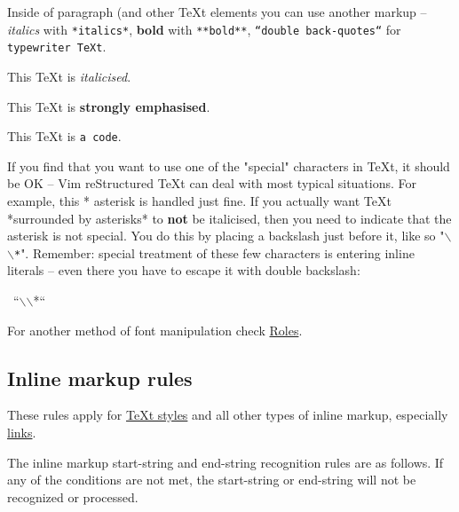 \documentclass[12pt]{article}
\begin{document}
Inside of paragraph (and other \TeX{}t elements you can use another markup
-- \emph{italics} with \texttt{*italics*}, \textbf{bold} with \texttt{**bold**},
\texttt{``double back-quotes``} for \texttt{typewriter \TeX{}t}.

This \TeX{}t is \emph{italicised}.

This \TeX{}t is \textbf{strongly emphasised}.

This \TeX{}t is \texttt{a code}.

If you find that you want to use one of the "special" characters in
\TeX{}t, it should be OK -- Vim reStructured \TeX{}t can deal with most typical situations.
For example, this * asterisk is handled just fine. If you actually
want \TeX{}t *surrounded by asterisks* to \textbf{not} be italicised, then
you need to indicate that the asterisk is not special. You do this by
placing a backslash just before it, like so "\texttt{$\backslash$$\backslash$*}". Remember: special
treatment of these few characters is entering inline literals -- even
there you have to escape it with double backslash:

\begin{ttfamily}\begin{flushleft}
\mbox{~``$\backslash$$\backslash$*``}\\
\end{flushleft}\end{ttfamily}

For another method of font manipulation check \href{\#lroles}{Roles}.

\hypertarget{linline-markup-rules}{}
\subsection{Inline markup rules}

These rules apply for \href{\#lTeXt-styles}{\TeX{}t styles} and all other types of inline markup,
especially \href{\#llinks}{links}.

The inline markup start-string and end-string recognition rules are as
follows. If any of the conditions are not met, the start-string or
end-string will not be recognized or processed.
\end{document}
